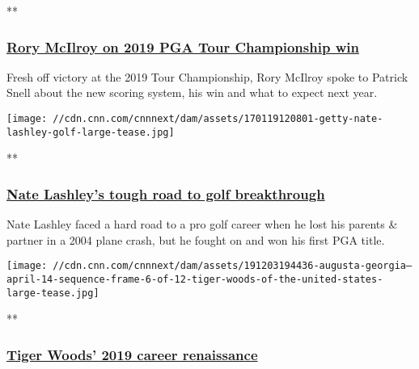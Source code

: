**

\hypertarget{rory-mcilroy-on-2019-pga-tour-championship-win}{%
\subsubsection{\texorpdfstring{\href{/videos/sports/2019/08/26/rory-mcilroy-interview-tour-championship-2019-golf-pga-spt-intl.cnn}{Rory
McIlroy on 2019 PGA Tour Championship
win}}{Rory McIlroy on 2019 PGA Tour Championship win}}\label{rory-mcilroy-on-2019-pga-tour-championship-win}}

Fresh off victory at the 2019 Tour Championship, Rory McIlroy spoke to
Patrick Snell about the new scoring system, his win and what to expect
next year.

\href{/videos/sports/2019/07/11/nate-lashley-golf-tragedy-pga-tour-win-spt-intl.cnn}{}

\texttt{[image: //cdn.cnn.com/cnnnext/dam/assets/170119120801-getty-nate-lashley-golf-large-tease.jpg]}

**

\hypertarget{nate-lashleys-tough-road-to-golf-breakthrough}{%
\subsubsection{\texorpdfstring{\href{/videos/sports/2019/07/11/nate-lashley-golf-tragedy-pga-tour-win-spt-intl.cnn}{Nate
Lashley's tough road to golf
breakthrough}}{Nate Lashley's tough road to golf breakthrough}}\label{nate-lashleys-tough-road-to-golf-breakthrough}}

Nate Lashley faced a hard road to a pro golf career when he lost his
parents \& partner in a 2004 plane crash, but he fought on and won his
first PGA title.

\href{/videos/sports/2019/12/04/tiger-woods-career-renaissance-masters-2019-pga-tour-golf-spt-intl.cnn}{}

\texttt{[image: //cdn.cnn.com/cnnnext/dam/assets/191203194436-augusta-georgia---april-14-sequence-frame-6-of-12-tiger-woods-of-the-united-states-large-tease.jpg]}

**

\hypertarget{tiger-woods-2019-career-renaissance}{%
\subsubsection{\texorpdfstring{\href{/videos/sports/2019/12/04/tiger-woods-career-renaissance-masters-2019-pga-tour-golf-spt-intl.cnn}{Tiger
Woods' 2019 career
renaissance}}{Tiger Woods' 2019 career renaissance}}\label{tiger-woods-2019-career-renaissance}}

